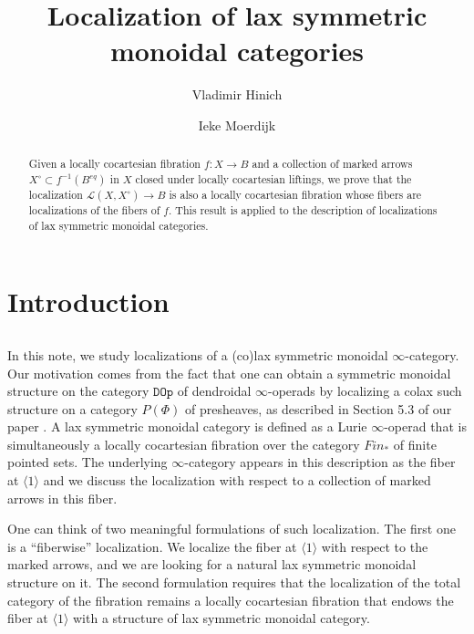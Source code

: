 \documentclass[12pt]{amsart}%
\newcommand{\eq}{\mathit{eq}}
\newcommand{\Fin}{\mathit{Fin}}
\newcommand{\DOp}{\mathtt{DOp}}
\newcommand{\cL}{\mathcal{L}}
\begin{document}
%
%
\title[]{Localization of lax symmetric monoidal categories}
\author{Vladimir Hinich}
\address{Department of Mathematics, University of Haifa, Mount Carmel, Haifa 3498838,  Israel}
\author{Ieke Moerdijk}
\address{Department of Mathematics, University of Utrecht,
Budapestlaan 6, Utrecht,  Netherlands} 
 \begin{abstract}
Given a locally cocartesian fibration $f:X\to B$ and a collection of marked arrows $X^\circ\subset f^{-1}(B^\eq)$
in $X$ closed under locally cocartesian liftings, we prove that the localization $\cL(X,X^\circ)\to B$ is also a
locally cocartesian fibration whose fibers are localizations
of the fibers of $f$. This result is applied to the description of localizations of lax symmetric monoidal
categories.
\end{abstract}
\maketitle

\section{Introduction}

\subsection{}
In this note, we study localizations of a (co)lax symmetric monoidal $\infty$-category. Our motivation comes from the fact that one can obtain a symmetric monoidal structure on the category $\DOp$ of dendroidal $\infty$-operads by localizing a colax such structure on a category $P(\Phi)$ of presheaves, as described in Section 5.3 of our paper \cite{HM}. A lax symmetric monoidal category is defined as a Lurie $\infty$-operad that is simultaneously a locally cocartesian fibration over the category $\Fin_*$ of finite pointed sets. The underlying 
$\infty$-category appears in this description as the fiber at $\langle 1\rangle$ and we discuss the localization with respect to a collection
of marked arrows in this fiber.

One can think of two meaningful formulations of such localization. The first one is a ``fiberwise'' localization. We localize
the fiber at $\langle 1\rangle$ with respect to the marked arrows, and we are looking for a natural lax symmetric monoidal structure on it.
The second formulation requires that the localization of 
the total category of the fibration remains a locally cocartesian fibration that endows  the fiber at $\langle 1\rangle$
with a structure of lax symmetric monoidal category. 
\end{document}
